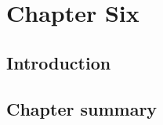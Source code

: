 %
%
\chapter{Chapter Six} \label{chap:six}

\section{Introduction} \label{sec:intro}


\section{Chapter summary}

